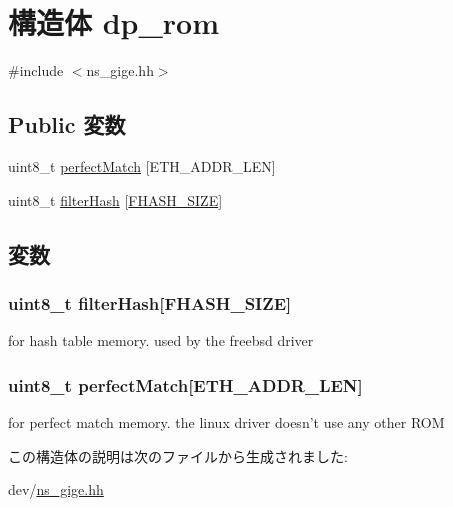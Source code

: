 \hypertarget{structdp__rom}{
\section{構造体 dp\_\-rom}
\label{structdp__rom}
}


{\ttfamily \#include $<$ns\_\-gige.hh$>$}\subsection*{Public 変数}
\begin{DoxyCompactItemize}
\item 
uint8\_\-t \hyperlink{structdp__rom_a910da8020a179bf2b36acf58f010f208}{perfectMatch} \mbox{[}ETH\_\-ADDR\_\-LEN\mbox{]}
\item 
uint8\_\-t \hyperlink{structdp__rom_a1aa6395107a6d16132e8e44277bd5549}{filterHash} \mbox{[}\hyperlink{ns__gige_8hh_a7d7c3db3667c7110b37292d81dc81362}{FHASH\_\-SIZE}\mbox{]}
\end{DoxyCompactItemize}


\subsection{変数}
\hypertarget{structdp__rom_a1aa6395107a6d16132e8e44277bd5549}{
\subsubsection[{filterHash}]{\setlength{\rightskip}{0pt plus 5cm}uint8\_\-t {\bf filterHash}\mbox{[}{\bf FHASH\_\-SIZE}\mbox{]}}}
\label{structdp__rom_a1aa6395107a6d16132e8e44277bd5549}
for hash table memory. used by the freebsd driver \hypertarget{structdp__rom_a910da8020a179bf2b36acf58f010f208}{
\subsubsection[{perfectMatch}]{\setlength{\rightskip}{0pt plus 5cm}uint8\_\-t {\bf perfectMatch}\mbox{[}ETH\_\-ADDR\_\-LEN\mbox{]}}}
\label{structdp__rom_a910da8020a179bf2b36acf58f010f208}
for perfect match memory. the linux driver doesn't use any other ROM 

この構造体の説明は次のファイルから生成されました:\begin{DoxyCompactItemize}
\item 
dev/\hyperlink{ns__gige_8hh}{ns\_\-gige.hh}\end{DoxyCompactItemize}
